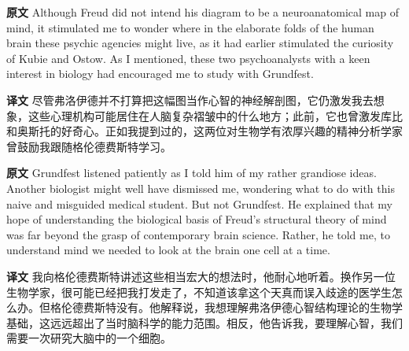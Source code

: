 \documentclass[UTF8]{ctexart}
\newenvironment{english}{\par\small\noindent\textbf{原文}\quad\ignorespaces}{\par}
\newenvironment{zhtranslation}{\par\noindent\textbf{译文}\quad\ignorespaces}{\par\vspace{0.35em}}
\begin{document}
\begin{english}
Although Freud did not intend his diagram to be a neuroanatomical map of mind, it stimulated me to wonder where in the elaborate folds of the human brain these psychic agencies might live, as it had earlier stimulated the curiosity of Kubie and Ostow. As I mentioned, these two psychoanalysts with a keen interest in biology had encouraged me to study with Grundfest.
\end{english}
\begin{zhtranslation}
尽管弗洛伊德并不打算把这幅图当作心智的神经解剖图，它仍激发我去想象，这些心理机构可能居住在人脑复杂褶皱中的什么地方；此前，它也曾激发库比和奥斯托的好奇心。正如我提到过的，这两位对生物学有浓厚兴趣的精神分析学家曾鼓励我跟随格伦德费斯特学习。\end{zhtranslation}

\begin{english}
Grundfest listened patiently as I told him of my rather grandiose ideas. Another biologist might well have dismissed me, wondering what to do with this naive and misguided medical student. But not Grundfest. He explained that my hope of understanding the biological basis of Freud's structural theory of mind was far beyond the grasp of contemporary brain science. Rather, he told me, to understand mind we needed to look at the brain one cell at a time.
\end{english}
\begin{zhtranslation}
我向格伦德费斯特讲述这些相当宏大的想法时，他耐心地听着。换作另一位生物学家，很可能已经把我打发走了，不知道该拿这个天真而误入歧途的医学生怎么办。但格伦德费斯特没有。他解释说，我想理解弗洛伊德心智结构理论的生物学基础，这远远超出了当时脑科学的能力范围。相反，他告诉我，要理解心智，我们需要一次研究大脑中的一个细胞。\end{zhtranslation}
\end{document}
